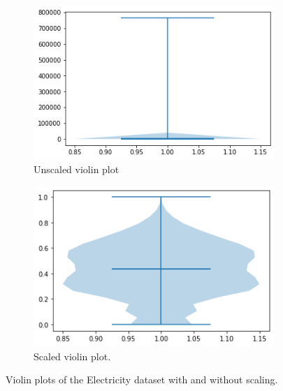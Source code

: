 \begin{figure}[htb]
  \centering
  \begin{subfigure}{0.49\textwidth}
    \includegraphics[width=\linewidth]{./img/electricity_violin_unscaled.png}
    \caption{Unscaled violin plot}
    \label{fig:electricity_violin_unscaled}
  \end{subfigure}
  \hfill
  \begin{subfigure}{0.49\textwidth}
    \includegraphics[width=\linewidth]{./img/electricity_violin.png}
    \caption{Scaled violin plot.}
    \label{fig:electricity_violin_scaled}
  \end{subfigure}
  \hfill
  \caption{Violin plots of the Electricity dataset with and without scaling.}
\end{figure}


